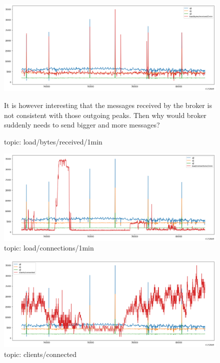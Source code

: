 \documentclass[12pt, letterpaper]{article}
\begin{document}
\begin{figure}
	\setlength{\tabcolsep}{0pt}
	\caption{topic: load/bytes/received/1min}
	\label{f:valid_cnt_load_bytes_received_1min}
	\begin{center}
		\includegraphics[width=\textwidth]{valid_cnt/valid_cnt-load_bytes_received_1min}	
	\end{center}
	It is however interesting that the messages received by the broker is not consistent with those outgoing peaks. Then why would broker suddenly needs to send bigger and more messages?
\end{figure}

\begin{figure}
	\setlength{\tabcolsep}{0pt}
	\caption{topic: load/connections/1min}
	\label{f:valid_cnt_load_connections_1min}
	\begin{center}
		\includegraphics[width=\textwidth]{valid_cnt/valid_cnt-load_connections_1min}	
	\end{center}
	
\end{figure}

\begin{figure}
	\setlength{\tabcolsep}{0pt}
	\caption{topic: clients/connected}
	\label{f:valid_cnt_clients_connected}
	\begin{center}
		\includegraphics[width=\textwidth]{valid_cnt/valid_cnt-clients_connected}	
	\end{center}
\end{figure}
\end{document}
